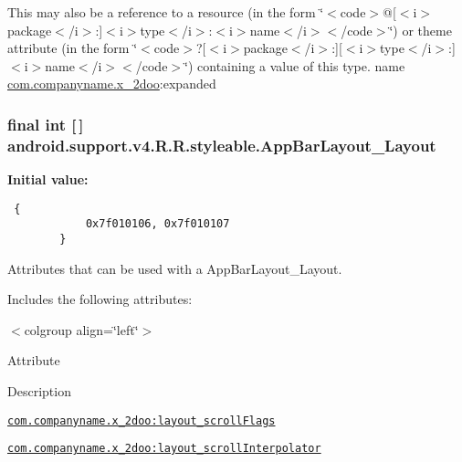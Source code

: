 This may also be a reference to a resource (in the form \char`\"{}$<$code$>$@\mbox{[}$<$i$>$package$<$/i$>$:\mbox{]}$<$i$>$type$<$/i$>$:$<$i$>$name$<$/i$>$$<$/code$>$\char`\"{}) or theme attribute (in the form \char`\"{}$<$code$>$?\mbox{[}$<$i$>$package$<$/i$>$:\mbox{]}\mbox{[}$<$i$>$type$<$/i$>$:\mbox{]}$<$i$>$name$<$/i$>$$<$/code$>$\char`\"{}) containing a value of this type.  name \hyperlink{namespacecom_1_1companyname_1_1x__2doo}{com.companyname.x\_\-2doo}:expanded \hypertarget{classandroid_1_1support_1_1v4_1_1_r_1_1styleable_3e73f9e75520cf590d9355042c5d4099}{
\subsubsection[{AppBarLayout\_\-Layout}]{\setlength{\rightskip}{0pt plus 5cm}final int \mbox{[}$\,$\mbox{]} android.support.v4.R.R.styleable.AppBarLayout\_\-Layout}}
\label{classandroid_1_1support_1_1v4_1_1_r_1_1styleable_3e73f9e75520cf590d9355042c5d4099}


\textbf{Initial value:}

\begin{Code}\begin{verbatim} {
            0x7f010106, 0x7f010107
        }
\end{verbatim}
\end{Code}
Attributes that can be used with a AppBarLayout\_\-Layout. 

Includes the following attributes: \begin{TabularC}{0}
\hline
\end{TabularC}
$<$colgroup align=\char`\"{}left\char`\"{}$>$ 

Attribute

Description 

{\tt \hyperlink{classandroid_1_1support_1_1v4_1_1_r_1_1styleable_77c239ef8452106864e05fd3dabb1747}{com.companyname.x\_\-2doo:layout\_\-scrollFlags}}

{\tt \hyperlink{classandroid_1_1support_1_1v4_1_1_r_1_1styleable_ffbd29e3aa103fef348ea2fe39dfda75}{com.companyname.x\_\-2doo:layout\_\-scrollInterpolator}}

